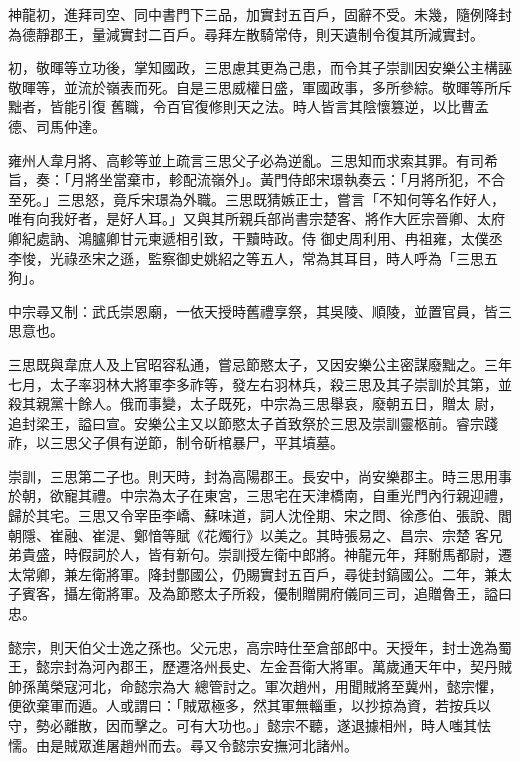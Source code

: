 \begin{pinyinscope}
 神龍初，進拜司空、同中書門下三品，加實封五百戶，固辭不受。未幾，隨例降封為德靜郡王，量減實封二百戶。尋拜左散騎常侍，則天遺制令復其所減實封。



 初，敬暉等立功後，掌知國政，三思慮其更為己患，而令其子崇訓因安樂公主構誣敬暉等，並流於嶺表而死。自是三思威權日盛，軍國政事，多所參綜。敬暉等所斥黜者，皆能引復
 舊職，令百官復修則天之法。時人皆言其陰懷篡逆，以比曹孟德、司馬仲達。



 雍州人韋月將、高軫等並上疏言三思父子必為逆亂。三思知而求索其罪。有司希旨，奏：「月將坐當棄市，軫配流嶺外」。黃門侍郎宋璟執奏云：「月將所犯，不合至死。」三思怒，竟斥宋璟為外職。三思既猜嫉正士，嘗言「不知何等名作好人，唯有向我好者，是好人耳。」又與其所親兵部尚書宗楚客、將作大匠宗晉卿、太府卿紀處訥、鴻臚卿甘元柬遞相引致，干黷時政。侍
 御史周利用、冉祖雍，太僕丞李悛，光祿丞宋之遜，監察御史姚紹之等五人，常為其耳目，時人呼為「三思五狗」。



 中宗尋又制：武氏崇恩廟，一依天授時舊禮享祭，其吳陵、順陵，並置官員，皆三思意也。



 三思既與韋庶人及上官昭容私通，嘗忌節愍太子，又因安樂公主密謀廢黜之。三年七月，太子率羽林大將軍李多祚等，發左右羽林兵，殺三思及其子崇訓於其第，並殺其親黨十餘人。俄而事變，太子既死，中宗為三思舉哀，廢朝五日，贈太
 尉，追封梁王，謚曰宣。安樂公主又以節愍太子首致祭於三思及崇訓靈柩前。睿宗踐祚，以三思父子俱有逆節，制令斫棺暴尸，平其墳墓。



 崇訓，三思第二子也。則天時，封為高陽郡王。長安中，尚安樂郡主。時三思用事於朝，欲寵其禮。中宗為太子在東宮，三思宅在天津橋南，自重光門內行親迎禮，歸於其宅。三思又令宰臣李嶠、蘇味道，詞人沈佺期、宋之問、徐彥伯、張說、閻朝隱、崔融、崔湜、鄭愔等賦《花燭行》以美之。其時張易之、昌宗、宗楚
 客兄弟貴盛，時假詞於人，皆有新句。崇訓授左衛中郎將。神龍元年，拜駙馬都尉，遷太常卿，兼左衛將軍。降封酆國公，仍賜實封五百戶，尋徙封鎬國公。二年，兼太子賓客，攝左衛將軍。及為節愍太子所殺，優制贈開府儀同三司，追贈魯王，謚曰忠。



 懿宗，則天伯父士逸之孫也。父元忠，高宗時仕至倉部郎中。天授年，封士逸為蜀王，懿宗封為河內郡王，歷遷洛州長史、左金吾衛大將軍。萬歲通天年中，契丹賊帥孫萬榮寇河北，命懿宗為大
 總管討之。軍次趙州，用聞賊將至冀州，懿宗懼，便欲棄軍而遁。人或謂曰：「賊眾極多，然其軍無輜重，以抄掠為資，若按兵以守，勢必離散，因而擊之。可有大功也。」懿宗不聽，遂退據相州，時人嗤其怯懦。由是賊眾進屠趙州而去。尋又令懿宗安撫河北諸州。




\end{pinyinscope}
